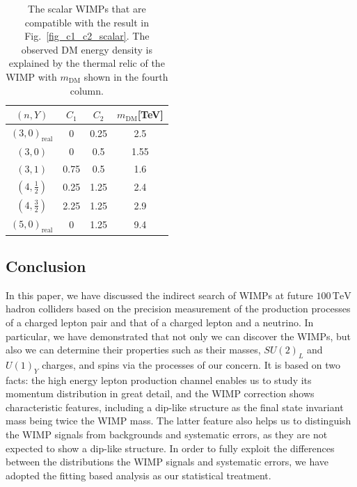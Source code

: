 \documentclass[12pt,twoside,book]{article}
\begin{document}
\begin{table}[t]
\centering
\begin{tabular}{|c|ccc|}
\hline
$(n, Y)$           & $C_1$ & $C_2$ & $m_\text{DM}$[TeV] \\ \hline\hline
$(3,0)_\text{real}$  &    0  &  0.25  & 2.5 \cite{Farina:2013mla}             \\
$(3,          0)$  &    0  & 0.5   & 1.55 \cite{DelNobile:2015bqo}              \\
$(3,          1)$  & 0.75  & 0.5   & 1.6 \cite{Farina:2013mla}               \\
$(4,\frac{1}{2})$  & 0.25  & 1.25  & 2.4 \cite{Farina:2013mla}             \\
$(4,\frac{3}{2})$  & 2.25  & 1.25  & 2.9 \cite{Farina:2013mla}             \\
$(5,0)_\text{real}$  &    0  &  1.25  & 9.4 \cite{Farina:2013mla}          \\
\hline
\end{tabular}
\caption{The scalar WIMPs that are compatible with the result in Fig.~\ref{fig_c1_c2_scalar}. The observed DM energy density is explained by the
thermal relic of the WIMP with $m_{\text{DM}}$ shown in the fourth column.}
\label{tab:minimalDM-for-950scalar-section}
\end{table}


\subsection{Conclusion}
\label{seq:conclusion}

In this paper, we have discussed the indirect search of WIMPs at future
$100\,\mathrm{TeV}$ hadron colliders based on the precision measurement
of the production processes of a charged lepton pair and that of a
charged lepton and a neutrino.  In particular, we have demonstrated that
not only we can discover the WIMPs, but also we can determine their
properties such as their masses, $SU(2)_L$ and $U(1)_Y$ charges, and
spins via the processes of our concern.  It is based on two facts: the
high energy lepton production channel enables us to study its momentum
distribution in great detail, and the WIMP correction shows
characteristic features, including a dip-like structure as the final
state invariant mass being twice the WIMP mass.  The latter feature
also helps us to distinguish the WIMP signals from backgrounds and
systematic errors, as they are not expected to show a dip-like
structure.  In order to fully exploit the differences between the
distributions the WIMP signals and systematic errors, we have adopted
the fitting based analysis as our statistical treatment.
\end{document}

